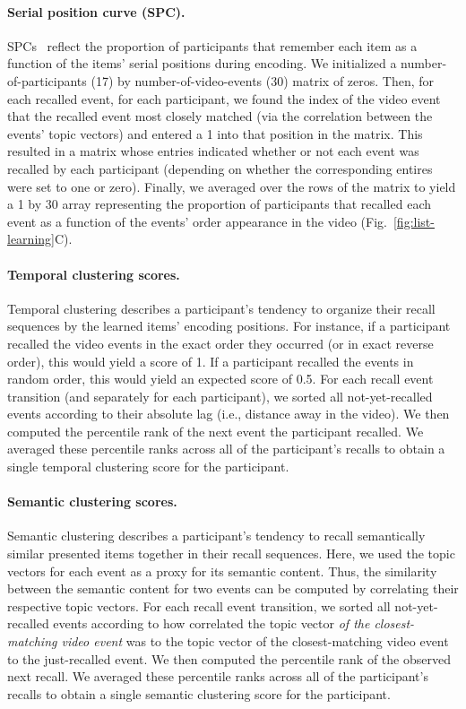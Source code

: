 \documentclass{article}
\begin{document}
\paragraph{Serial position curve (SPC).} SPCs~\citep{Murd62a} reflect the proportion of participants that remember each item as a function of the items' serial positions during encoding. We initialized a number-of-participants (17) by number-of-video-events (30) matrix of zeros. Then, for each recalled event, for each participant, we found the index of the video event that the recalled event most closely matched (via the correlation between the events' topic vectors) and entered a 1 into that position in the matrix. This resulted in a matrix whose entries indicated whether or not each event was recalled by each participant (depending on whether the corresponding entires were set to one or zero).  Finally, we averaged over the rows of the matrix to yield a 1 by 30 array representing the proportion of participants that recalled each event as a function of the events' order appearance in the video (Fig.~\ref{fig:list-learning}C).

\paragraph{Temporal clustering scores.} Temporal clustering describes a participant's tendency to organize their recall sequences by the learned items' encoding positions.  For instance, if a participant recalled the video events in the exact order they occurred (or in exact reverse order), this would yield a score of 1.  If a participant recalled the events in random order, this would yield an expected score of 0.5.  For each recall event transition (and separately for each participant), we sorted all not-yet-recalled events according to their absolute lag (i.e., distance away in the video).  We then computed the percentile rank of the next event the participant recalled.  We averaged these percentile ranks across all of the participant's recalls to obtain a single temporal clustering score for the participant.

\paragraph{Semantic clustering scores.} Semantic clustering describes a participant's tendency to recall semantically similar presented items together in their recall sequences.  Here, we used the topic vectors for each event as a proxy for its semantic content. Thus, the similarity between the semantic content for two events can be computed by correlating their respective topic vectors.  For each recall event transition, we sorted all not-yet-recalled events according to how correlated the topic vector \textit{of the closest-matching video event} was to the topic vector of the closest-matching video event to the just-recalled event.  We then computed the percentile rank of the observed next recall.  We averaged these percentile ranks across all of the participant's recalls to obtain a single semantic clustering score for the participant.
\end{document}

